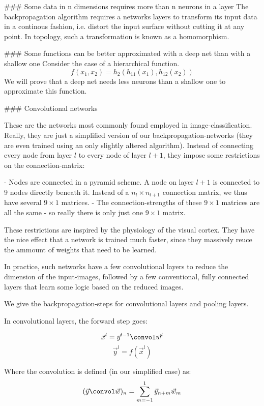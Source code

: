 ### Some data in n dimensions requires more than n neurons in a layer
The backpropagation algorithm requires a networks layers to transform its input data in a continous fashion, i.e. distort the input surface without cutting it at any point. In topology, such a transformation is known as a homomorphism.  

### Some functions can be better approximated with a deep net than with a shallow one
Consider the case of a hierarchical function. 
$$ f(x_1, x_2) = h_2( h_11(x_1), h_12(x_2))$$
We will prove that a deep net needs less neurons than a shallow one to approximate this function.





### Convolutional networks

These are the networks most commonly found employed in image-classification. Really, they are just a simplified version of our backpropagation-networks (they are even trained using an only slightly altered algorithm). Instead of connecting every node from layer $l$ to every node of layer $l+1$, they impose some restrictions on the connection-matrix:

	- Nodes are connected in a pyramid scheme. A node on layer $l+1$ is connected to 9 nodes directly beneath it. Instead of a $n_l \times n_{l+1}$ connection matrix, we thus have several $9 \times 1$ matrices.
	- The connection-strengths of these  $9 \times 1$ matrices are all the same - so really there is only just one  $9 \times 1$ matrix. 

These restrictions are inspired by the physiology of the visual cortex. They have the nice effect that a network is trained much faster, since they massively reuce the ammount of weights that need to be learned. 

In practice, such networks have a few convolutional layers to reduce the dimension of the input-images, followed by a few conventional, fully connected layers that learn some logic based on the reduced images. 

We give the backpropagation-steps for convolutional layers and pooling layers. 

In convolutional layers, the forward step goes: 

$$ \vec{x}^l = \vec{y}^{l-1} \convol \vec{w}^l $$
$$ \vec{y}^l = f(\vec{x}^l) $$

Where the convolution is defined (in our simplified case) as:
$$ (\vec{y} \convol \vec{w})_n = \sum_{m=-1}^1 \vec{y}_{n+m} \vec{w}_m $$

